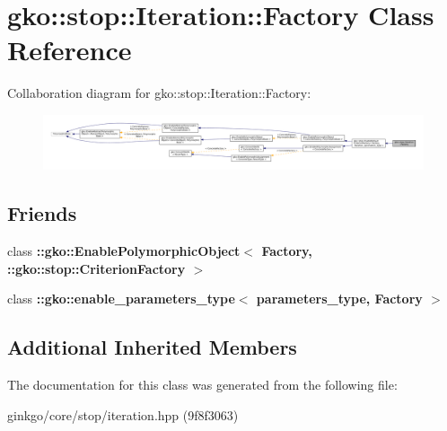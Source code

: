 \hypertarget{classgko_1_1stop_1_1Iteration_1_1Factory}{}\section{gko\+:\+:stop\+:\+:Iteration\+:\+:Factory Class Reference}
\label{classgko_1_1stop_1_1Iteration_1_1Factory}


Collaboration diagram for gko\+:\+:stop\+:\+:Iteration\+:\+:Factory\+:
\nopagebreak
\begin{figure}[H]
\begin{center}
\leavevmode
\includegraphics[width=350pt]{classgko_1_1stop_1_1Iteration_1_1Factory__coll__graph}
\end{center}
\end{figure}
\subsection*{Friends}
\begin{DoxyCompactItemize}
\item 
\mbox{\label{classgko_1_1stop_1_1Iteration_1_1Factory_aaa5507cf00e5361a77971746fefa42e6}} 
class {\bfseries \+::gko\+::\+Enable\+Polymorphic\+Object$<$ Factory, \+::gko\+::stop\+::\+Criterion\+Factory $>$}
\item 
\mbox{\label{classgko_1_1stop_1_1Iteration_1_1Factory_a0d176cbd42d6214e11aee8c30ca256fc}} 
class {\bfseries \+::gko\+::enable\+\_\+parameters\+\_\+type$<$ parameters\+\_\+type, Factory $>$}
\end{DoxyCompactItemize}
\subsection*{Additional Inherited Members}


The documentation for this class was generated from the following file\+:\begin{DoxyCompactItemize}
\item 
ginkgo/core/stop/iteration.\+hpp (9f8f3063)\end{DoxyCompactItemize}
